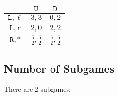 \documentclass{article}
\begin{document}
    \begin{center}
    \begin{tabular}{c|c c}
    & $\mathtt{U}$ & $\mathtt{D}$ \\\hline
    $\mathtt{L}, \ell$ & $3,3$ & $0, 2$ \\
    $\mathtt{L}, \mathtt{r}$ & $2,0$ & $2,2$ \\
    $\mathtt{R}, \mathtt{*}$ & $\frac{5}{2}, \frac{5}{2}$ & $\frac{5}{2}, \frac{5}{2}$ \\
    \end{tabular}
    \end{center}

    \subsection{Number of Subgames}

    There are 2 subgames:
\end{document}
